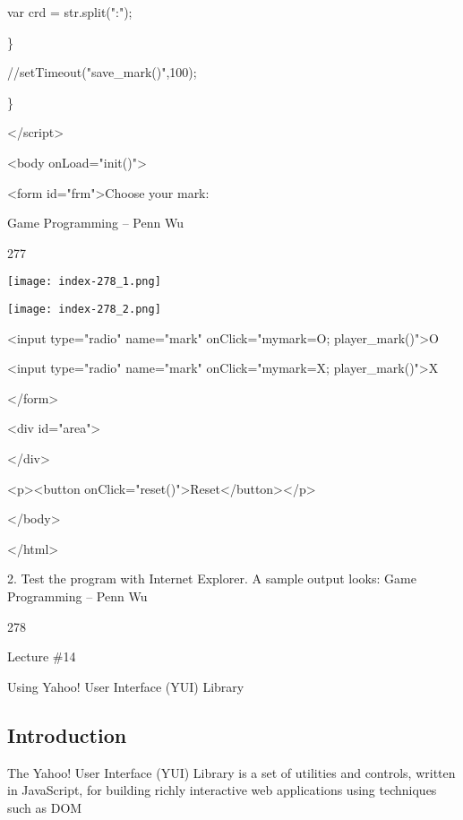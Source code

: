 \documentclass[
]{article}
\begin{document}
var crd = str.split(":");

\}

//setTimeout("save\_mark()",100);

\}

\textless/script\textgreater{}

\textless body onLoad="init()"\textgreater{}

\textless form id="frm"\textgreater Choose your mark:

Game Programming -- Penn Wu

277

\protect\hypertarget{index_split_014.htmlux5cux23p278}{}{}\texttt{[image: index-278\_1.png]}

\texttt{[image: index-278\_2.png]}

\textless input type="radio" name="mark"
onClick="mymark=\textquotesingle O\textquotesingle;
player\_mark()"\textgreater O

\textless input type="radio" name="mark"
onClick="mymark=\textquotesingle X\textquotesingle;
player\_mark()"\textgreater X

\textless/form\textgreater{}

\textless div id="area"\textgreater{}

\textless/div\textgreater{}

\textless p\textgreater\textless button
onClick="reset()"\textgreater Reset\textless/button\textgreater\textless/p\textgreater{}

\textless/body\textgreater{}

\textless/html\textgreater{}

2. Test the program with Internet Explorer. A sample output looks: Game
Programming -- Penn Wu

278

\protect\hypertarget{index_split_014.htmlux5cux23p279}{}{}

Lecture \#14

Using Yahoo! User Interface (YUI) Library

\protect\hypertarget{index_split_015.html}{}{}

\hypertarget{index_split_015.htmlux5cux23calibre_pb_14}{%
\subsection{Introduction}\label{index_split_015.htmlux5cux23calibre_pb_14}}

The Yahoo! User Interface (YUI) Library is a set of utilities and
controls, written in JavaScript, for building richly interactive web
applications using techniques such as DOM
\end{document}

